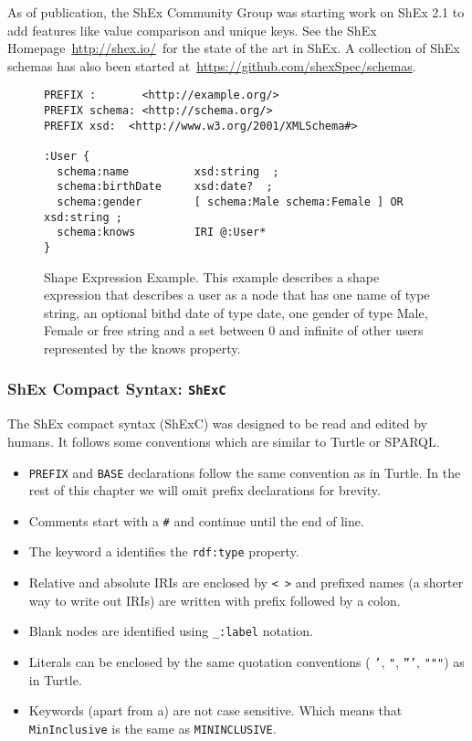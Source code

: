 As of publication, the ShEx Community Group was starting work on ShEx 2.1 to add features like value comparison and unique keys. See the ShEx Homepage \url{http://shex.io/} for the state of the art in ShEx. A collection of ShEx schemas has also been started at \url{https://github.com/shexSpec/schemas}.

\begin{figure}[hb]
\begin{lstlisting}
PREFIX :       <http://example.org/>
PREFIX schema: <http://schema.org/>
PREFIX xsd:  <http://www.w3.org/2001/XMLSchema#>

:User {
  schema:name          xsd:string  ;
  schema:birthDate     xsd:date?  ;
  schema:gender        [ schema:Male schema:Female ] OR xsd:string ;
  schema:knows         IRI @:User*
}
\end{lstlisting}
\caption[Shape Expression Example]{Shape Expression Example. This example describes a shape expression that describes a user as a node that has one name of type string, an optional bithd date of type date, one gender of type Male, Female or free string and a set between 0 and infinite of other users represented by the knows property.}
\end{figure}

\subsubsection{ShEx Compact Syntax: \texttt{ShExC}}
The ShEx compact syntax (ShExC) was designed to be read and edited by humans. It follows some conventions which are similar to Turtle or SPARQL.

\begin{itemize}
	\item \texttt{PREFIX} and \texttt{BASE} declarations follow the same convention as in Turtle. In the rest of this chapter we will omit prefix declarations for brevity.
	\item Comments start with a \texttt{\#} and continue until the end of line.
	\item The keyword a identifies the \texttt{rdf:type} property.
	\item Relative and absolute IRIs are enclosed by \texttt{< >} and prefixed names (a shorter way to write out IRIs) are written with prefix followed by a colon.
	\item Blank nodes are identified using \texttt{\_:label} notation.
	\item Literals can be enclosed by the same quotation conventions ( \texttt{'}, \texttt{"}, \texttt{'''}, \texttt{"""}) as in Turtle.
	\item Keywords (apart from a) are not case sensitive. Which means that \texttt{MinInclusive} is the same as \texttt{MININCLUSIVE}.
\end{itemize}

